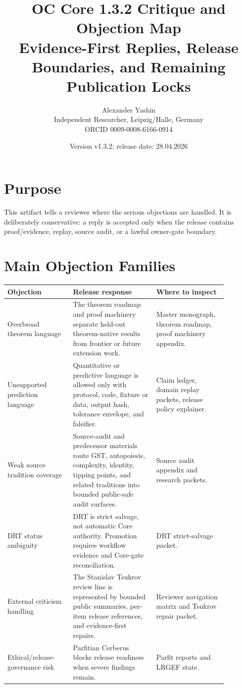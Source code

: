\documentclass[11pt,a4paper]{article}
\title{\textbf{OC Core 1.3.2 Critique and Objection Map}\\
\large Evidence-First Replies, Release Boundaries, and Remaining Publication Locks}
\author{Alexander Yashin\\Independent Researcher, Leipzig/Halle, Germany\\ORCID 0009-0008-6166-0914}
\date{Version v1.3.2; release date: 28.04.2026}
\begin{document}
\maketitle

\section*{Purpose}
This artifact tells a reviewer where the serious objections are handled. It is deliberately conservative: a reply is accepted only when the release contains proof/evidence, replay, source audit, or a lawful owner-gate boundary.

\section*{Main Objection Families}
\begin{longtable}{>{\raggedright\arraybackslash}p{0.26\linewidth}>{\raggedright\arraybackslash}p{0.33\linewidth}>{\raggedright\arraybackslash}p{0.29\linewidth}}
\textbf{Objection} & \textbf{Release response} & \textbf{Where to inspect}\\
\hline
Overbroad theorem language & The theorem roadmap and proof machinery separate held-out theorem-native results from frontier or future extension work. & Master monograph, theorem roadmap, proof machinery appendix.\\
Unsupported prediction language & Quantitative or predictive language is allowed only with protocol, code, fixture or data, output hash, tolerance envelope, and falsifier. & Claim ledger, domain replay packets, release policy explainer.\\
Weak source tradition coverage & Source-audit and predecessor materials route GST, autopoiesis, complexity, identity, tipping points, and related traditions into bounded public-safe audit surfaces. & Source audit appendix and research packets.\\
DRT status ambiguity & DRT is strict salvage, not automatic Core authority. Promotion requires workflow evidence and Core-gate reconciliation. & DRT strict-salvage packet.\\
External criticism handling & The Stanislav Tsukrov review line is represented by bounded public summaries, per-item release references, and evidence-first repairs. & Reviewer navigation matrix and Tsukrov repair packet.\\
Ethical/release-governance risk & Parfitian Cerberus blocks release readiness when severe findings remain. & Parfit reports and LRGEF state.\\
\end{longtable}
\end{document}
